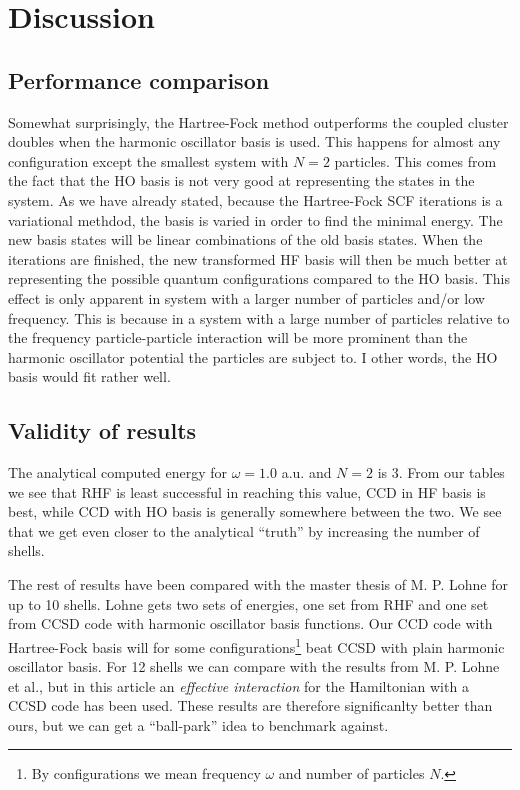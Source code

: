 \documentclass[
    a4paper, aps, twocolumn, floatfix, superscriptaddress,
    nofootinbib]{revtex4-1}
\newcommand{\1}{\mathds{1}}
\begin{document}
\section{Discussion}

    \subsection{Performance comparison}
        Somewhat surprisingly, the Hartree-Fock method outperforms the coupled
        cluster doubles when the harmonic oscillator basis is used. This
        happens for almost any configuration except the smallest system
        with $N=2$ particles. This comes from the fact that the HO basis is
        not very good at representing the states in the system. As we have
        already stated, because the Hartree-Fock SCF iterations is a variational
        methdod, the basis is varied in order to find the minimal energy. The new
        basis states will be linear combinations of the old basis states. When
        the iterations are finished, the new transformed HF basis will then be
        much better at representing the possible quantum configurations compared
        to the HO basis. This effect is only apparent in system with a larger
        number of particles and/or low frequency. This is because in a system with
        a large number of particles relative to the frequency particle-particle
        interaction will be more prominent than the harmonic oscillator potential
        the particles are subject to. I other words, the HO basis would fit rather
        well.

    \subsection{Validity of results}
        The analytical computed energy for $\omega=1.0$ a.u.
        and $N=2$ is $3$\cite{taut1994two}. From our tables we see
        that RHF is least successful in reaching this value, CCD in
        HF basis is best, while CCD with HO basis is generally somewhere
        between the two. We see that we get even closer to the analytical
        ``truth'' by increasing the number of shells.

        The rest of results have been compared with the master thesis of M. P.
        Lohne\cite{lohne2010coupled} for up to 10 shells. Lohne gets two sets of
        energies, one set from RHF and one set from CCSD code with harmonic
        oscillator basis functions. Our CCD code with Hartree-Fock basis will
        for some configurations\footnote{By configurations we mean frequency
        $\omega$ and number of particles $N$.} beat CCSD with plain harmonic
        oscillator basis. For 12 shells we can compare with the results from M.
        P. Lohne et al.\cite{lohne2011ab}, but in this article an
        \emph{effective interaction} for the Hamiltonian with a CCSD code has
        been used. These results are therefore significanlty better than ours,
        but we can get a ``ball-park'' idea to benchmark against.
\end{document}
